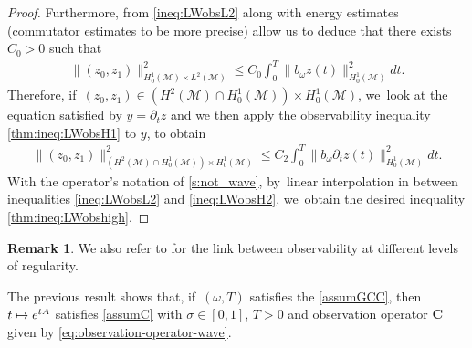 \documentclass[10pt]{amsart}
\newcommand\mto{\mathchoice{\longmapsto}{\mapsto}{\mapsto}{\mapsto}}
\theoremstyle{definition}
\newtheorem{remark}[theorem]{Remark}
\let\mc\mathcal
\newcommand{\M}{\mc{M}}
\newcommand{\bC}{\boldsymbol{C}}
\providecommand{\norm}[1]{\lVert#1\rVert}
\begin{document}
\begin{proof}
Furthermore, from \eqref{ineq:LWobsL2} along with energy estimates (commutator estimates to be more precise) allow us to deduce that there exists $C_0>0$ such that\vspace*{-3pt}
\begin{align}\label{thm:ineq:LWobsH1}
\norm{(z_0, z_1)}_{H_0^1(\M)\times L^2(\M)}^2\leq C_0\int_0^T \norm{b_\omega z(t)}_{H_0^1(\M)}^2 dt.
\end{align}
Therefore, if~$(z_0, z_1)\in (H^2(\M)\cap H_0^1(\M))\times H_0^1(\M)$, we~look at the equation satisfied by $y=\partial_t z$ and we then apply the observability inequality \eqref{thm:ineq:LWobsH1} to $y$, to obtain\vspace*{-3pt}
\begin{align}\label{ineq:LWobsH2}
\norm{(z_0, z_1)}_{(H^2(\M)\cap H_0^1(\M))\times H_0^1(\M)}^2\leq C_2\int_0^T \norm{b_\omega \partial_t z(t)}_{H_0^1(\M)}^2dt.
\end{align}
With the operator's notation of \cref{s:not_wave}, by~linear interpolation in between inequalities \eqref{ineq:LWobsL2} and \eqref{ineq:LWobsH2}, we~obtain the desired inequality \eqref{thm:ineq:LWobshigh}.
\end{proof}

\begin{remark}
We also refer to \cite{Per25} for the link between observability at different levels of regularity.
\end{remark}

The previous result shows that, if~$(\omega, T)$ satisfies the \ref{assumGCC}, then $t\mto e^{tA}$ satisfies \cref{assumC} with $\sigma\in [0,1]$, $T>0$ and observation operator $\bC$ given by \eqref{eq:observation-operator-wave}.
\end{document}
